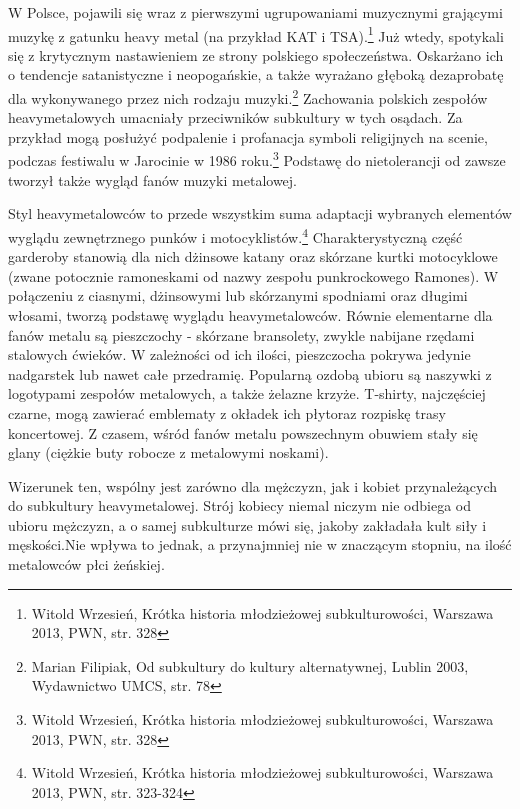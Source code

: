 \documentclass[12pt, a4paper, titlepage]{report}
\begin{document}
W Polsce, pojawili się wraz z pierwszymi ugrupowaniami muzycznymi grającymi muzykę z gatunku heavy metal (na przykład KAT i TSA).\footnote{Witold Wrzesień, Krótka historia młodzieżowej subkulturowości, Warszawa 2013, PWN, str. 328} Już wtedy, spotykali się z krytycznym nastawieniem ze strony polskiego społeczeństwa. Oskarżano ich o tendencje satanistyczne i neopogańskie, a także wyrażano głęboką dezaprobatę dla wykonywanego przez nich rodzaju muzyki.\footnote{Marian Filipiak, Od subkultury do kultury alternatywnej, Lublin 2003, Wydawnictwo UMCS, str. 78}  Zachowania polskich zespołów heavymetalowych umacniały przeciwników subkultury w tych osądach. Za przykład mogą posłużyć podpalenie i profanacja symboli religijnych na scenie, podczas festiwalu w Jarocinie w 1986 roku.\footnote{Witold Wrzesień, Krótka historia młodzieżowej subkulturowości, Warszawa 2013, PWN, str. 328} Podstawę do nietolerancji od zawsze tworzył także wygląd fanów muzyki metalowej.
 
Styl heavymetalowców to przede wszystkim suma adaptacji wybranych elementów wyglądu zewnętrznego punków i motocyklistów.\footnote{Witold Wrzesień, Krótka historia młodzieżowej subkulturowości, Warszawa 2013, PWN, \break str. 323-324} Charakterystyczną \break część garderoby stanowią dla nich dżinsowe katany oraz skórzane kurtki motocyklowe (zwane potocznie ramoneskami od nazwy zespołu punkrockowego Ramones). W połączeniu z ciasnymi, dżinsowymi lub skórzanymi spodniami oraz długimi włosami, tworzą podstawę wyglądu heavymetalowców. Równie elementarne dla fanów metalu są pieszczochy - skórzane bransolety, zwykle nabijane rzędami stalowych ćwieków. W zależności od ich ilości, pieszczocha pokrywa jedynie nadgarstek lub nawet całe przedramię. Popularną ozdobą ubioru są naszywki z logotypami zespołów metalowych, a także żelazne krzyże. T-shirty, najczęściej czarne, mogą zawierać emblematy z okładek ich płyt\footnotemark[\value{footnote}] oraz rozpiskę trasy koncertowej. %
Z czasem, wśród fanów metalu powszechnym obuwiem stały się glany (ciężkie buty robocze z metalowymi noskami). 

Wizerunek ten, wspólny jest zarówno dla mężczyzn, jak i kobiet przynależących do subkultury heavymetalowej. Strój kobiecy niemal niczym nie odbiega od ubioru mężczyzn, a o samej subkulturze mówi się, jakoby zakładała kult siły i męskości.\footnotemark[\value{footnote}] Nie wpływa to jednak, a przynajmniej nie w znaczącym stopniu, na ilość metalowców płci żeńskiej. 
\end{document}
